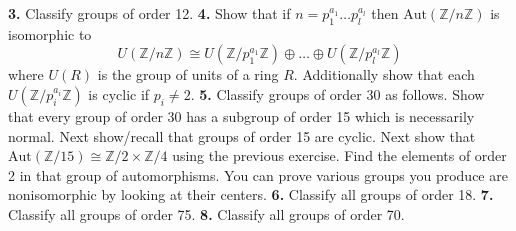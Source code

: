 \documentclass[11pt]{amsart}
\theoremstyle{theorem}
\newcommand{\bZ}{\mathbb{Z}}
\newcommand{\Aut}{\mathrm{Aut}}
\begin{document}
\newpage
\noindent
{\bf 3.}  Classify groups of order 12.
\newpage
\noindent
{\bf 4.}  Show that if $n = p_1^{a_1} \dots p_l^{a_l}$ then $\Aut(\bZ/n\bZ)$ is isomorphic to 
\[
    U(\bZ/n\bZ) \cong U(\bZ/p_1^{a_1} \bZ) \oplus \dots \oplus U(\bZ/p_l^{a_l} \bZ)
\]
where $U(R)$ is the group of units of a ring $R$.  Additionally show that each $U(\bZ/p_i^{a_i} \bZ)$ is cyclic if $p_i \neq 2$.
\newpage
\noindent
{\bf 5.}  Classify groups of order 30 as follows.  Show that every group of order 30 has a subgroup of order 15 which is necessarily normal.  Next show/recall that groups of order 15 are cyclic.  Next show that $\Aut(\bZ/15) \cong \bZ/2 \times \bZ/4$ using the previous exercise.  Find the elements of order 2 in that group of automorphisms.  You can prove various groups you produce are nonisomorphic by looking at their centers.
\newpage
\noindent
{\bf 6.}  Classify all groups of order 18.
\newpage
\noindent
{\bf 7.}  Classify all groups of order 75.
\newpage
\noindent
{\bf 8.}  Classify all groups of order 70.
\end{document}
